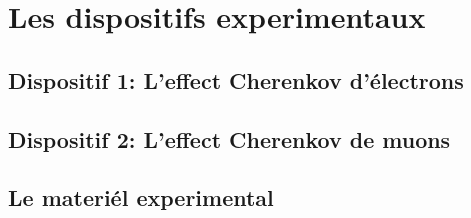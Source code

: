 \section{Les dispositifs experimentaux}
\subsection{Dispositif 1: L'effect Cherenkov d'\'electrons}

\subsection{Dispositif 2: L'effect Cherenkov de muons}

\subsection{Le materi\'el experimental}

